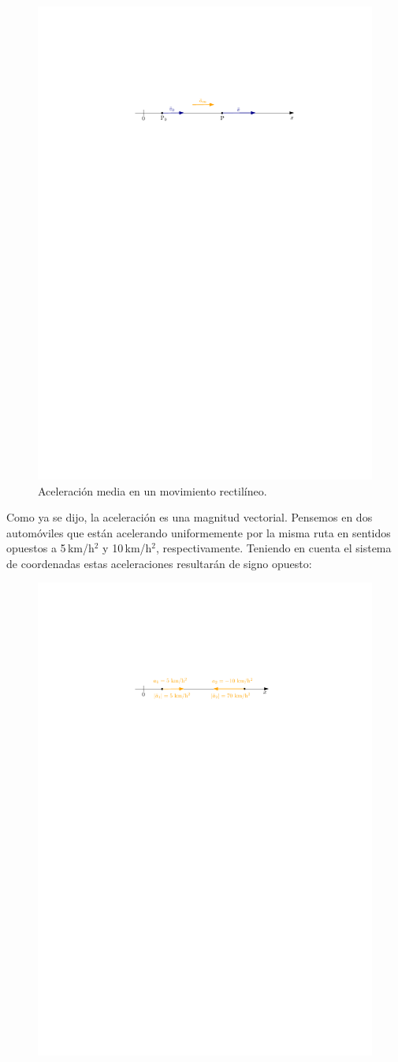 \begin{figure}[!h]
\centering
 \includegraphics[width=.6\textwidth]{img/amedia.pdf}
 \caption{Aceleración media en un movimiento rectilíneo.}
\end{figure}


Como ya se dijo, la aceleración es una magnitud vectorial. Pensemos en dos automóviles que están acelerando  uniformemente por la misma ruta en sentidos opuestos a 5\,km/h$^2$ y 10\,km/h$^2$, respectivamente. Teniendo en cuenta el sistema de coordenadas estas aceleraciones resultarán de signo opuesto:



\begin{figure}[!h]
\centering
 \includegraphics[width=.6\textwidth]{img/acomp1.pdf}
\end{figure}

